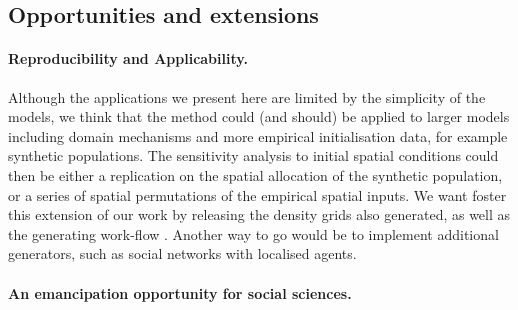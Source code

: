 \documentclass[Royal,sageh,times]{sagej}
\begin{document}

\subsection{Opportunities and extensions}


\paragraph{Reproducibility and Applicability.} 
Although the applications we present here are limited by the simplicity of the models, we think that the method could (and should) be applied to larger models including domain mechanisms and more empirical initialisation data, for example synthetic populations. The sensitivity analysis to initial spatial conditions could then be either a replication on the spatial allocation of the synthetic population, or a series of spatial permutations of the empirical spatial inputs.
We want foster this extension of our work by releasing the density grids also generated, as well as the generating work-flow . Another way to go would be to implement additional generators, such as social networks \citep{alizadeh2016generating} with localised agents. 


\paragraph{An emancipation opportunity for social sciences.}

\end{document}
